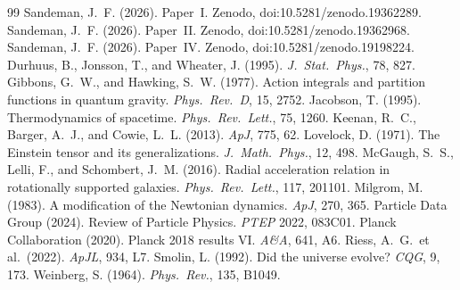 \documentclass[12pt,a4paper]{article}
\begin{document}

\begin{thebibliography}{99}
 Sandeman, J.~F. (2026). Paper~I. Zenodo, doi:10.5281/zenodo.19362289.
 Sandeman, J.~F. (2026). Paper~II. Zenodo, doi:10.5281/zenodo.19362968.
 Sandeman, J.~F. (2026). Paper~IV. Zenodo, doi:10.5281/zenodo.19198224.
 Durhuus, B., Jonsson, T., and Wheater, J. (1995). \textit{J.\ Stat.\ Phys.}, 78, 827.
 Gibbons, G.~W., and Hawking, S.~W. (1977). Action integrals and partition functions in quantum gravity. \textit{Phys.\ Rev.~D}, 15, 2752.
 Jacobson, T. (1995). Thermodynamics of spacetime. \textit{Phys.\ Rev.\ Lett.}, 75, 1260.
 Keenan, R.~C., Barger, A.~J., and Cowie, L.~L. (2013). \textit{ApJ}, 775, 62.
 Lovelock, D. (1971). The Einstein tensor and its generalizations. \textit{J.\ Math.\ Phys.}, 12, 498.
 McGaugh, S.~S., Lelli, F., and Schombert, J.~M. (2016). Radial acceleration relation in rotationally supported galaxies. \textit{Phys.\ Rev.\ Lett.}, 117, 201101.
 Milgrom, M. (1983). A modification of the Newtonian dynamics. \textit{ApJ}, 270, 365.
 Particle Data Group (2024). Review of Particle Physics. \textit{PTEP} 2022, 083C01.
 Planck Collaboration (2020). Planck 2018 results VI. \textit{A\&A}, 641, A6.
 Riess, A.~G.\ et al.\ (2022). \textit{ApJL}, 934, L7.
 Smolin, L. (1992). Did the universe evolve? \textit{CQG}, 9, 173.
 Weinberg, S. (1964). \textit{Phys.\ Rev.}, 135, B1049.
\end{thebibliography}
\end{document}
